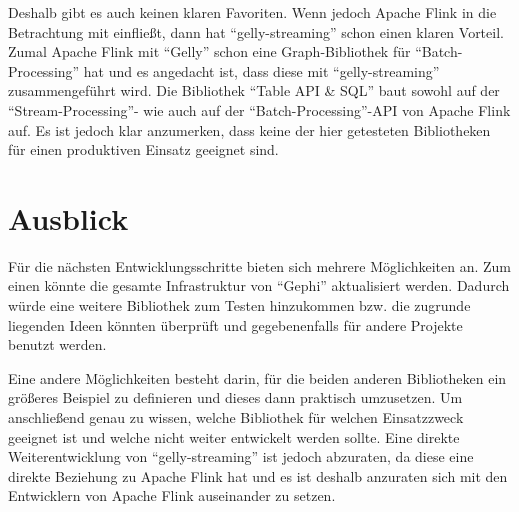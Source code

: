 Deshalb gibt es auch keinen klaren Favoriten. Wenn jedoch Apache Flink in die
Betrachtung mit einfließt, dann hat \enquote{gelly-streaming} schon einen klaren
Vorteil. Zumal Apache Flink mit \enquote{Gelly} schon eine Graph-Bibliothek für
\enquote{Batch-Processing} hat und es angedacht ist, dass diese mit
\enquote{gelly-streaming} zusammengeführt wird. Die Bibliothek \enquote{Table API \& SQL}
baut sowohl auf der \enquote{Stream-Processing}- wie auch auf der
\enquote{Batch-Processing}-\gls{API} von Apache Flink auf. Es ist jedoch klar
anzumerken, dass keine der hier getesteten Bibliotheken für einen produktiven
Einsatz geeignet sind.

\section{Ausblick}
Für die nächsten Entwicklungsschritte bieten sich mehrere Möglichkeiten an. Zum
einen könnte die gesamte Infrastruktur von \enquote{Gephi} aktualisiert werden.
Dadurch würde eine weitere Bibliothek zum Testen hinzukommen bzw. die zugrunde
liegenden Ideen könnten überprüft und gegebenenfalls für andere Projekte benutzt
werden.

Eine andere Möglichkeiten besteht darin, für die beiden anderen Bibliotheken ein
größeres Beispiel zu definieren und dieses dann praktisch umzusetzen. Um
anschließend genau zu wissen, welche Bibliothek für welchen Einsatzzweck geeignet
ist und welche nicht weiter entwickelt werden sollte. Eine direkte Weiterentwicklung
von \enquote{gelly-streaming} ist jedoch abzuraten, da diese eine direkte Beziehung
zu Apache Flink hat und es ist deshalb anzuraten sich mit den Entwicklern von
Apache Flink auseinander zu setzen.
